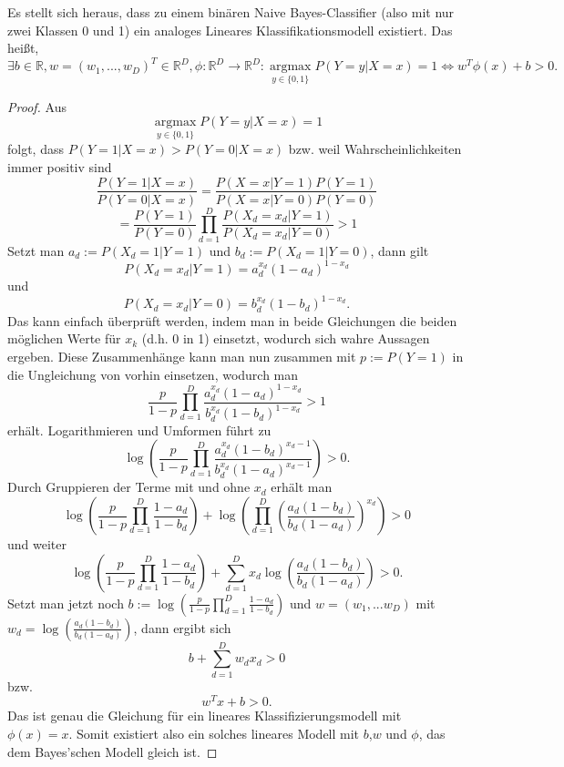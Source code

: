 \documentclass{article}
\begin{document}
Es stellt sich heraus, dass zu einem binären Naive Bayes-Classifier (also mit nur zwei Klassen 0 und 1) ein analoges Lineares Klassifikationsmodell existiert. Das heißt, \[
\exists b\in\mathbb R, w=(w_1,...,w_D)^T\in\mathbb R^D,\phi:\mathbb R^D\rightarrow\mathbb R^D:
\underset{y\in\{0,1\}}{\operatorname{argmax}}P(Y=y|X=x)=1\iff w^T\phi(x)+b>0.
\]
\begin{proof}
    Aus \[\underset{y\in\{0,1\}}{\operatorname{argmax}} P(Y=y|X=x)=1\]folgt, dass \(P(Y=1|X=x)>P(Y=0|X=x)\) bzw. weil Wahrscheinlichkeiten immer positiv sind\[
    \frac{P(Y=1|X=x)}{P(Y=0|X=x)}=\frac{P(X=x|Y=1)P(Y=1)}{P(X=x|Y=0)P(Y=0)}
    \]\[
    =\frac{P(Y=1)}{P(Y=0)}\prod\limits_{d=1}^D \frac{P(X_d=x_d|Y=1)}{P(X_d=x_d|Y=0)}>1
    \]
    Setzt man \(a_d:=P(X_d=1|Y=1)\) und \(b_d:=P(X_d=1|Y=0)\), dann gilt \[
    P(X_d=x_d|Y=1)=a_d^{x_d}(1-a_d)^{1-x_d}
    \]und\[
    P(X_d=x_d|Y=0)=b_d^{x_d}(1-b_d)^{1-x_d}.
    \]Das kann einfach überprüft werden, indem man in beide Gleichungen die beiden möglichen Werte für \(x_k\) (d.h. 0 in 1) einsetzt, wodurch sich wahre Aussagen ergeben. Diese Zusammenhänge kann man nun zusammen mit \(p:=P(Y=1)\) in die Ungleichung von vorhin einsetzen, wodurch man\[
    \frac{p}{1-p}\prod\limits_{d=1}^D \frac{a_d^{x_d}(1-a_d)^{1-x_d}}{b_d^{x_d}(1-b_d)^{1-x_d}}>1
    \]erhält. Logarithmieren und Umformen führt zu\[
    \log(\frac p{1-p}\prod\limits_{d=1}^D\frac{a_d^{x_d}(1-b_d)^{x_d-1}}{b_d^{x_d}(1-a_d)^{x_d-1}})>0.
    \]Durch Gruppieren der Terme mit und ohne \(x_d\) erhält man \[
    \log(\frac p{1-p}\prod\limits_{d=1}^D\frac{1-a_d}{1-b_d})+\log(\prod\limits_{d=1}^D(\frac{a_d(1-b_d)}{b_d(1-a_d)})^{x_d})>0
    \]und weiter\[
    \log(\frac p{1-p}\prod\limits_{d=1}^D\frac{1-a_d}{1-b_d})+\sum\limits_{d=1}^Dx_d\log(\frac{a_d(1-b_d)}{b_d(1-a_d)})>0.
    \]
    Setzt man jetzt noch \(b:=\log(\frac p{1-p}\prod_{d=1}^D\frac{1-a_d}{1-b_d})\) und \(w=(w_1,...w_D)\) mit \(w_d=\log(\frac{a_d(1-b_d)}{b_d(1-a_d)})\), dann ergibt sich\[
    b+\sum\limits_{d=1}^Dw_dx_d>0
    \]bzw.\[
    w^Tx+b>0.
    \]Das ist genau die Gleichung für ein lineares Klassifizierungsmodell mit \(\phi(x)=x\). Somit existiert also ein solches lineares Modell mit \(b\),\(w\) und \(\phi\), das dem Bayes'schen Modell gleich ist.
\end{proof}
\end{document}
